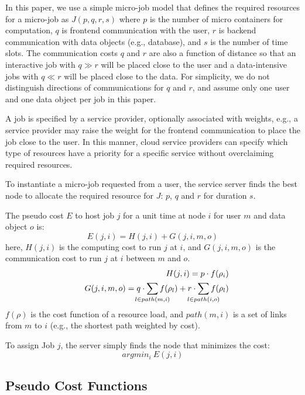 In this paper, we use a simple micro-job model that defines the
required resources for a micro-job as $J(p, q, r, s)$ where 
$p$ is the number of micro containers for computation, 
$q$ is frontend communication with the user, 
$r$ is backend communication with data objects (e.g., database), and
$s$ is the number of time slots.
The communication costs $q$ and $r$ are also a function of distance so
that an interactive job with $q \gg r$ will be placed close to the
user and a data-intensive jobs with $q \ll r$ will be placed close to
the data.
For simplicity, we do not distinguish directions of
communications for $q$ and $r$, and assume only one user and one data
object per job in this paper.

A job is specified by a service provider, optionally associated with
weights, e.g., a service provider may raise the weight for the
frontend communication to place the job close to the user.
In this manner, cloud service providers can specify which
type of resources have a priority for a specific service without
overclaiming required resources.

To instantiate a micro-job requested from a user, the service
server finds the best node to allocate the required resource
for $J$: $p$, $q$ and $r$ for duration $s$.

The pseudo cost $E$ to host job $j$ for a unit time at node $i$ for
user $m$ and data object $o$ is:
\begin{equation*}
	E(j, i)     = H(j,i) + G(j,i,m,o)
\end{equation*}
here, $H(j, i)$ is the computing cost to run $j$ at $i$, and
$G(j, i, m, o)$ is the communication cost to run $j$ at $i$
between $m$ and $o$.
\begin{eqnarray*}
&&  H(j,i)      = p \cdot f(\rho_{i}) \\
&&  G(j,i,m,o)  = q \cdot \smashoperator{\sum_{l \in path(m,i)}} f(\rho_{l}) + r \cdot \smashoperator{\sum_{l \in path(i,o)}} f(\rho_{l})
\end{eqnarray*}
$f(\rho)$ is the cost function of a resource load, and $path(m,i)$ is a set
of links from $m$ to $i$ (e.g., the shortest path weighted by cost).

To assign Job $j$, the server simply finds the node that minimizes the
cost:
\begin{equation*}
	argmin_{i} \: E(j, i)
\end{equation*}

\subsection{Pseudo Cost Functions}


